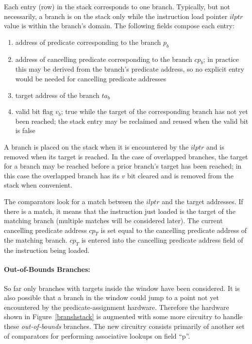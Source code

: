 \documentclass[10pt,dvips]{article}
\begin{document}
Each entry (row) in the stack corresponds to one branch. Typically, but not
necessarily, a branch is on the stack only while the instruction load pointer
$ilptr$ 
value is within the branch's domain. The following fields compose each entry:
\begin{enumerate}
\item address of predicate corresponding to the branch $p_b$
\item address of cancelling predicate corresponding to the branch $cp_b$; in practice
this may be derived from the branch's predicate address, so no explicit entry would
be needed for cancelling predicate addresses
\item target address of the branch $ta_b$
\item valid bit flag $v_b$; true while the target of the corresponding branch
has not yet been reached; the stack entry may be reclaimed and reused when the
valid bit is false
\end{enumerate}

A branch is placed on the stack when it is encountered by the $ilptr$ and is
removed when its target is reached. In the case of overlapped branches, the
target for a branch may be reached before a prior branch's target has been
reached; in this case the overlapped branch has its $v$ bit cleared and
is removed from the stack when convenient.

The comparators look for a match between the $ilptr$ and the target addresses.
If there is a match, it means that the instruction just loaded is the target
of the matching branch (multiple matches will be considered later). The
current cancelling predicate address $cp_T$ is set equal to the cancelling
predicate address of the matching branch. $cp_T$ is entered into the cancelling
predicate address field of the instruction being loaded.

\paragraph{Out-of-Bounds Branches: }
So far only branches with targets inside the window have been considered.
It is also possible that a branch in the window could jump to a point
not yet encountered by the predicate-assignment hardware. Therefore
the hardware shown in Figure~\ref{branshstack} is augmented
with some more circuitry to handle these 
{\it out-of-bounds} branches.
The new circuitry consists primarily of another set of comparators
for performing associative
lookups on field ``p''.
\end{document}
